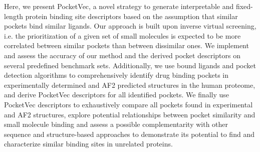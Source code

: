 Here, we present PocketVec, a novel strategy to generate interpretable and fixed-length protein binding site descriptors based on the assumption that similar pockets bind similar ligands. Our approach is built upon inverse virtual screening, i.e. the prioritization of a given set of small molecules is expected to be more correlated between similar pockets than between dissimilar ones. We implement and assess the accuracy of our method and the derived pocket descriptors on several predefined benchmark sets. Additionally, we use bound ligands and pocket detection algorithms to comprehensively identify drug binding pockets in experimentally determined and AF2 predicted structures in the human proteome, and derive PocketVec descriptors for all identified pockets. We finally use PocketVec descriptors to exhaustively compare all pockets found in experimental and AF2 structures, explore potential relationships between pocket similarity and small molecule binding and assess a possible complementarity with other sequence and structure-based approaches to demonstrate its potential to find and characterize similar binding sites in unrelated proteins.
